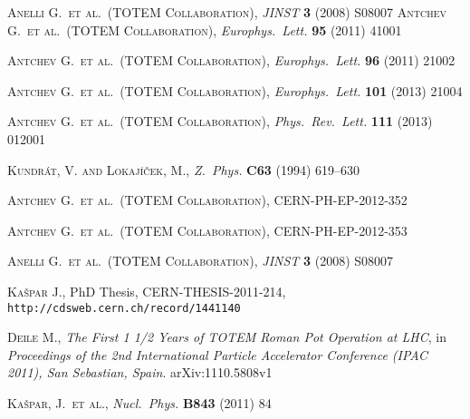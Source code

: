 \documentclass[TOTEM]{cern/cernphprep}
\def\etal{et al.}
\def\Name#1{\textsc{#1}, }
\def\REVIEW#1#2#3#4{{\it #1} {\bf #2} (#3) #4}
\begin{document}
\begin{thebibliography}{99}

	\Name{Anelli G.~\etal{}~(TOTEM Collaboration)}
	\REVIEW{JINST}{3}{2008}{S08007}
	\Name{Antchev G.~\etal{}~(TOTEM Collaboration)}
	\REVIEW{Europhys.~Lett.}{95}{2011}{41001}

	\Name{Antchev G.~\etal{}~(TOTEM Collaboration)}
	\REVIEW{Europhys.~Lett.}{96}{2011}{21002}

	\Name{Antchev G.~\etal{}~(TOTEM Collaboration)}
	\REVIEW{Europhys.~Lett.}{101}{2013}{21004}

	\Name{Antchev G.~\etal{}~(TOTEM Collaboration)}
	\REVIEW{Phys.~Rev.~Lett.}{111}{2013}{012001}

	\Name{Kundr\' at, V. and Lokaj\' i\v cek, M.}
	\REVIEW{Z.~Phys.}{C63}{1994}{619--630}


\iffalse
{} 
	\Name{Antchev G.~\etal{}~(TOTEM Collaboration)}
	CERN-PH-EP-2012-352

	\Name{Antchev G.~\etal{}~(TOTEM Collaboration)}
	CERN-PH-EP-2012-353

	\Name{Anelli G.~\etal{}~(TOTEM Collaboration)}
	\REVIEW{JINST}{3}{2008}{S08007}

	\Name{Ka\v spar J.}
	PhD Thesis, CERN-THESIS-2011-214, {\tt http://cdsweb.cern.ch/record/1441140}

	\Name{Deile M.}
	{\it The First 1 1/2 Years of TOTEM Roman Pot Operation at LHC}, in
	{\it Proceedings of the 2nd International Particle Accelerator Conference (IPAC 2011), San Sebastian, Spain}. 
	arXiv:1110.5808v1

	\Name{Ka\v spar, J.~\etal}
	\REVIEW{Nucl.~Phys.}{B843}{2011}{84}


\end{thebibliography}
\end{document}
